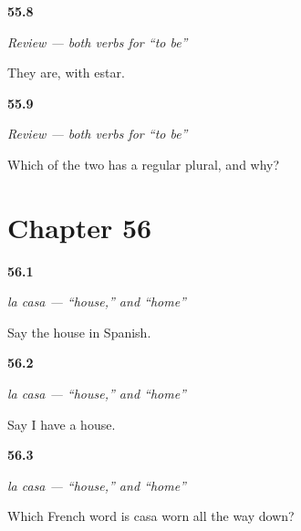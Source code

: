 \noindent\begin{minipage}[t]{\linewidth}
\raggedright
\hypertarget{review-ES-C09-repaso-ser-estar-they}{\textbf{55.8}} \emph{Review — both verbs for \textquotedblleft{}to be\textquotedblright{}}\par
\small They are, with estar.
\end{minipage}\par\medskip

\noindent\begin{minipage}[t]{\linewidth}
\raggedright
\hypertarget{review-ES-C09-repaso-ser-estar-why}{\textbf{55.9}} \emph{Review — both verbs for \textquotedblleft{}to be\textquotedblright{}}\par
\small Which of the two has a regular plural, and why?
\end{minipage}\par\medskip

\section*{Chapter 56}

\noindent\begin{minipage}[t]{\linewidth}
\raggedright
\hypertarget{review-ES-C43-casa-article}{\textbf{56.1}} \emph{la casa — \textquotedblleft{}house,\textquotedblright{} and \textquotedblleft{}home\textquotedblright{}}\par
\small Say the house in Spanish.
\end{minipage}\par\medskip

\noindent\begin{minipage}[t]{\linewidth}
\raggedright
\hypertarget{review-ES-C43-casa-have}{\textbf{56.2}} \emph{la casa — \textquotedblleft{}house,\textquotedblright{} and \textquotedblleft{}home\textquotedblright{}}\par
\small Say I have a house.
\end{minipage}\par\medskip

\noindent\begin{minipage}[t]{\linewidth}
\raggedright
\hypertarget{review-ES-C43-casa-french}{\textbf{56.3}} \emph{la casa — \textquotedblleft{}house,\textquotedblright{} and \textquotedblleft{}home\textquotedblright{}}\par
\small Which French word is casa worn all the way down?
\end{minipage}\par\medskip

